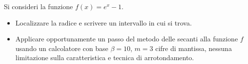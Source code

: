 Si consideri la funzione $f(x)=e^x-1$.
\begin{itemize}
\item  Localizzare la radice e
scrivere un intervallo in cui si trova.

\item Applicare opportunamente un passo del metodo delle secanti alla funzione $f$
usando un calcolatore con base $\beta =10$, $m=3$ cifre di
mantissa, nessuna limitazione sulla caratteristica e tecnica di
arrotondamento.
\end{itemize}
